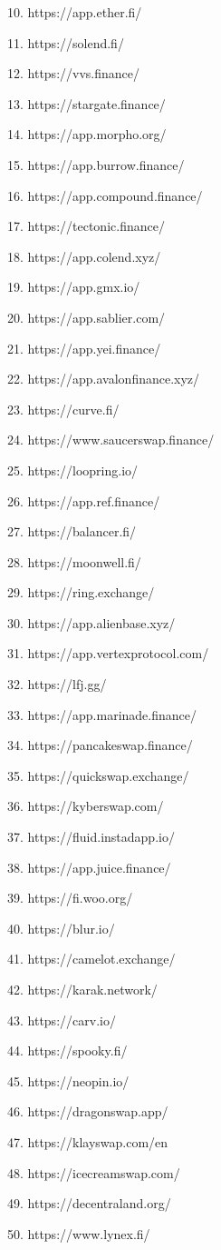 \documentclass[conference]{IEEEtran}
\begin{document}
10. https://app.ether.fi/

11. https://solend.fi/

12. https://vvs.finance/

13. https://stargate.finance/

14. https://app.morpho.org/

15. https://app.burrow.finance/

16. https://app.compound.finance/

17. https://tectonic.finance/

18. https://app.colend.xyz/

19. https://app.gmx.io/

20. https://app.sablier.com/

21. https://app.yei.finance/

22. https://app.avalonfinance.xyz/

23. https://curve.fi/

24. https://www.saucerswap.finance/

25. https://loopring.io/

26. https://app.ref.finance/

27. https://balancer.fi/

28. https://moonwell.fi/

29. https://ring.exchange/

30. https://app.alienbase.xyz/

31. https://app.vertexprotocol.com/

32. https://lfj.gg/

33. https://app.marinade.finance/

34. https://pancakeswap.finance/

35. https://quickswap.exchange/

36. https://kyberswap.com/

37. https://fluid.instadapp.io/

38. https://app.juice.finance/

39. https://fi.woo.org/

40. https://blur.io/

41. https://camelot.exchange/

42. https://karak.network/

43. https://carv.io/

44. https://spooky.fi/

45. https://neopin.io/

46. https://dragonswap.app/

47. https://klayswap.com/en

48. https://icecreamswap.com/

49. https://decentraland.org/

50. https://www.lynex.fi/
\end{document}

